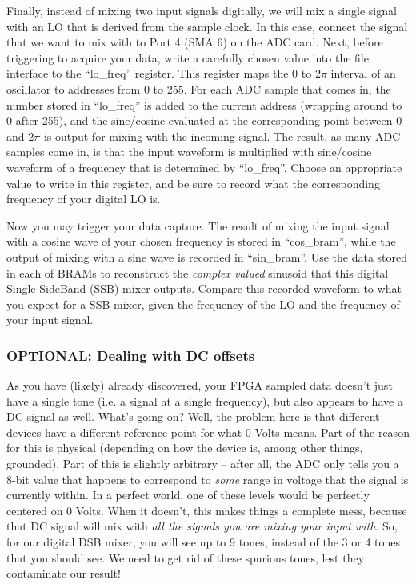 \documentclass[11pt]{article}
\begin{document}
Finally, instead of mixing two input signals digitally, we will mix a single signal with an LO that is
derived from the sample clock.  In this case, connect the signal that we want to mix with to Port 4 (SMA 6)
on the ADC card.  Next, before triggering to acquire your data, write a carefully chosen value
into the file interface to the ``lo\_freq'' register.  This register maps the 0 to $2\pi$ interval
of an oscillator to addresses from 0 to 255.  For each ADC sample that comes in, the number stored
in ``lo\_freq'' is added to the current address (wrapping around to 0 after 255), and the sine/cosine
evaluated at the corresponding point between 0 and $2\pi$ is output for mixing with the incoming signal.
The result, as many ADC samples come in, is that the input waveform is multiplied with sine/cosine waveform
of a frequency that is determined by ``lo\_freq''.  Choose an appropriate value to write in this register,
and be sure to record what the corresponding frequency of your digital LO is.

Now you may trigger your data capture.  The result of mixing the input signal with a cosine wave of your
chosen frequency is stored in ``cos\_bram'', while the output of mixing with a sine wave is recorded
in ``sin\_bram''.  Use the data stored in each of BRAMs to reconstruct the {\it complex valued} sinusoid
that this digital Single-SideBand (SSB) mixer outputs.  Compare this recorded waveform to what you
expect for a SSB mixer, given the frequency of the LO and the frequency of your input signal.

\subsubsection{OPTIONAL: Dealing with DC offsets}

As you have (likely) already discovered, your FPGA sampled data doesn't just have
a single tone (i.e. a signal at a single frequency), but also appears to have a DC signal as well.
What's going on? Well, the problem here is that different devices have a different reference
point for what 0 Volts means. Part of the reason for this is physical (depending on how the device
is, among other things, grounded). Part of this is slightly arbitrary -- after all, the ADC only
tells you a 8-bit value that happens to correspond to \emph{some} range in voltage that the
signal is currently within. In a perfect world, one of these levels would be perfectly centered on 0 Volts. When it doesn't, this makes things a complete mess, because that DC signal will mix with \emph{all the signals you are mixing your input with}. So, for our digital DSB mixer, you will see up to 9 tones, instead of the 3 or 4 tones that you should see. We need to get rid of these spurious tones, lest they contaminate our result!
\end{document}
